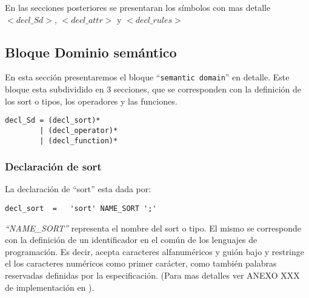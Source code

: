 En las secciones posteriores se presentaran los símbolos con mas detalle  \textit{$<decl\_Sd>$}, \textit{$<decl\_attr>$} y \textit{$<decl\_rules>$}

\subsection{Bloque Dominio semántico}

En esta sección presentaremos el bloque ``\texttt{semantic domain}'' en detalle. Este bloque esta subdividido en 3 secciones, que se corresponden con la definición de los sort o tipos, los operadores y las funciones.
\begin{center}
\lstset{language=inform}
\tiny
\begin{lstlisting}[frame=single]
decl_Sd = (decl_sort)*
        | (decl_operator)*
        | (decl_function)*
\end{lstlisting}
\end{center}
\subsubsection{Declaración de sort}
La declaración de ``sort'' esta dada por:
\begin{center}
\lstset{language=inform}
\tiny
\begin{lstlisting}[frame=single]
decl_sort  =   'sort' NAME_SORT ';'
\end{lstlisting}
\end{center}
\textit{``NAME\_SORT''} representa el nombre del sort o tipo. El mismo se corresponde con la definición de un identificador en el común de los lenguajes de programación. Es decir, acepta caracteres alfanuméricos y guión bajo y restringe el los caracteres numéricos como primer carácter, como también palabras reservadas definidas por la especificación. (Para mas detalles ver ANEXO  XXX de implementación en \spirit).

